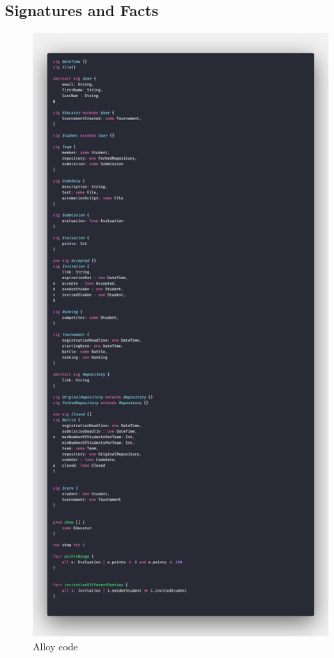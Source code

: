 \subsection{Signatures and Facts}
\begin{figure}
    \includegraphics[width=\textwidth]{Images/code.png}
    \caption{Alloy code}
    \label{fig:alloy-code}
\end{figure}